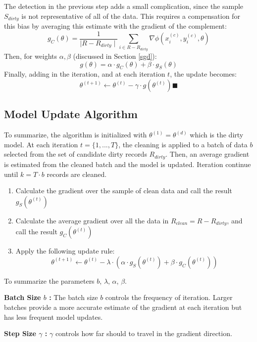 The detection in the previous step adds a small complication, since the sample $S_{dirty}$ is not representative of all of the data.
This requires a compensation for this bias by averaging this estimate with the gradient of the complement:
\[
g_C(\theta) = \frac{1}{\mid R - R_{dirty}\mid}\sum_{i \in R - R_{dirty}}\nabla\phi(x_i^{(c)},y_i^{(c)},\theta)
\]
Then, for weights $\alpha,\beta$ (discussed in Section \ref{sgd}):
\[
g(\theta) = \alpha \cdot g_C(\theta) + \beta \cdot g_S(\theta)
\]
Finally, adding in the iteration, and at each iteration $t$, the update becomes:
\[
\theta^{(t+1)} \leftarrow \theta^{(t)} - \gamma \cdot g(\theta^{(t)}) \blacksquare
\]

\subsection{Model Update Algorithm}
To summarize, the algorithm is initialized with $\theta^{(1)} = \theta^{(d)}$ which is the dirty model.
At each iteration $t=\{1,...,T\}$, the cleaning is applied to a batch of data $b$ selected from the set of candidate dirty records $R_{dirty}$.
Then, an average gradient is estimated from the cleaned batch and the model is updated.
Iteration continue until $k = T \cdot b$ records are cleaned.

\begin{enumerate}[noitemsep]
	\item Calculate the gradient over the sample of clean data and call the result $g_S(\theta^{(t)})$
	\item Calculate the average gradient over all the data in $R_{clean}=R-R_{dirty}$, and call the result $g_C(\theta^{(t)})$
	\item Apply the following update rule:
	\[
	\theta^{(t+1)} \leftarrow \theta^{(t)} - \lambda \cdot(\alpha\cdot g_S(\theta^{(t)}) + \beta \cdot  g_C(\theta^{(t)}))
	\]
\end{enumerate} 

\noindent To summarize the parameters $b$, $\lambda$, $\alpha$, $\beta$.

\vspace{0.25em}

\noindent\textbf{Batch Size $b$ : } The batch size $b$ controls the frequency of iteration. Larger batches provide a more accurate estimate of the gradient at each iteration but has less frequent model updates. 

\vspace{0.25em}

\noindent\textbf{Step Size $\gamma$ : } $\gamma$ controls how far should to travel in the gradient direction.


